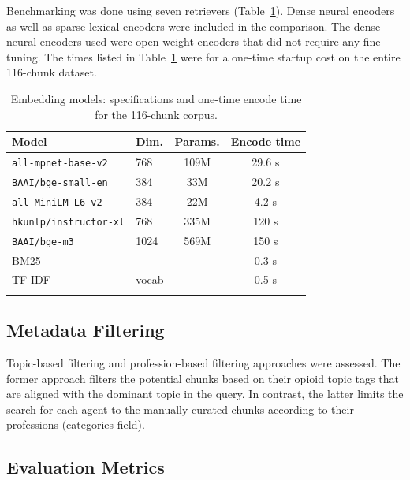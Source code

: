 \documentclass[pdflatex,sn-mathphys-num]{sn-jnl}
\theoremstyle{thmstyleone}
\theoremstyle{thmstyletwo}
\theoremstyle{thmstylethree}
\begin{document}
Benchmarking was done using seven retrievers (Table~\ref{tab:models}). Dense neural encoders as well as sparse lexical encoders were included in the comparison. The dense neural encoders used were open-weight encoders that did not require any fine-tuning. The times listed in Table~\ref{tab:models} were for a one-time startup cost on the entire 116-chunk dataset.

\begin{table}[h]
    \centering
    \caption{Embedding models: specifications and one-time encode time for the 116-chunk corpus.}
    \label{tab:models}
    \begin{tabular}{@{}llcc@{}}
        \toprule
        \textbf{Model} & \textbf{Dim.} & \textbf{Params.} & \textbf{Encode time} \\
        \midrule
        \texttt{all-mpnet-base-v2}    & 768   & 109M  & 29.6 s \\
        \texttt{BAAI/bge-small-en}    & 384   & 33M   & 20.2 s \\
        \texttt{all-MiniLM-L6-v2}     & 384   & 22M   & 4.2 s  \\
        \texttt{hkunlp/instructor-xl} & 768   & 335M  & 120 s  \\
        \texttt{BAAI/bge-m3}          & 1024  & 569M  & 150 s  \\
        BM25                          & ---   & ---   & 0.3 s  \\
        TF-IDF                        & vocab & ---   & 0.5 s  \\
        \botrule
    \end{tabular}
\end{table}

\subsection{Metadata Filtering}

Topic-based filtering and profession-based filtering approaches were assessed. The former approach filters the potential chunks based on their opioid topic tags that are aligned with the dominant topic in the query. In contrast, the latter limits the search for each agent to the manually curated chunks according to their professions (categories field).

\subsection{Evaluation Metrics}
\end{document}
